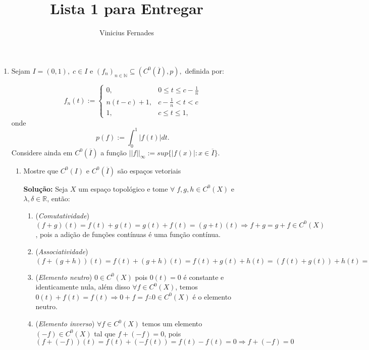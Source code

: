 \documentclass{article}
\begin{document}
	
	\title{Lista 1 para Entregar}
	\author{Vinicius Fernades}
	
	\maketitle
	
	\begin{enumerate}
		\item Sejam $I = (0,1), \; c \in I$ e $(f_n)_{n \in \mathbb{N}} \subseteq (C^0(\overline{I}), p), $ definida por:
		
		$$f_n(t) := \left\{
		\begin{array}{cc}
			0, & 0 \leq t \leq c - \frac{1}{n} \\
			n(t-c) + 1, & c - \frac{1}{n} < t < c \\
			1, & c \leq t \leq 1,
		\end{array}
		\right.
		$$ 
		onde 
		$$
			p(f) := \int_{0}^{1} |f(t)|dt.
		$$
		Considere ainda em $C^{0}(\overline{I})$ a função $||f||_{\infty} := sup\{|f(x)|: x \in \overline{I}\}.$
		
		\begin{enumerate}
			\item Mostre que $C^{0}(I)$ e $C^{0}(\overline{I})$ são espaços vetoriais
			
			\textbf{Solução:} Seja $X$ um espaço topológico e tome $\forall \;f, g, h \in C^{0}(X)$ e $\lambda, \delta \in \mathbb{R}$, então:
			\begin{enumerate}
				\item (\textit{Comutatividade}) $(f+g)(t) = f(t) + g(t) = g(t) + f(t) = (g+t)(t) \Rightarrow f+g = g+f \in  C^{0}(X)$, pois a adição de funções contínuas é uma função contínua.
				
				\item (\textit{Associatividade}) $(f+(g+h))(t) =  f(t)+(g+h)(t) =    f(t)+ g(t)+h(t) = (f(t)+g(t))+h(t) = ((f+g)+h)(t) \Rightarrow f+(g+h)=(f+g)+h \in C^{0}(X)$
				
				\item (\textit{Elemento neutro}) $ 0 \in C^{0}(X)$ pois $0(t) = 0$ é constante e identicamente nula, além disso $\forall f \in C^{0}(X) $, temos $0(t) + f(t) = f(t) \Rightarrow 0 +f = f \therefore 0 \in C^{0}(X)$ é o elemento neutro.
				
				\item (\textit{Elemento inverso}) $\forall f \in C^{0}(X)$ temos um elemento $(-f) \in C^{0}(X)$ tal que $f + (-f) = 0$, pois $(f +(-f))(t) = f(t) +(-f(t)) = f(t)-f(t)= 0 \Rightarrow f +(-f) = 0$
				

\end{enumerate}
\end{enumerate}
\end{enumerate}
\end{document}
